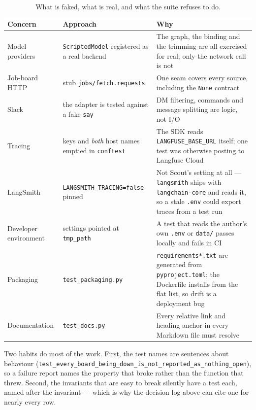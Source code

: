 \documentclass[11pt,a4paper]{article}
\newcommand{\tablefont}{\footnotesize}
\begin{document}
\begin{table}[!ht]
\centering\tablefont
\caption{What is faked, what is real, and what the suite refuses to do.}
\label{tab:testing}
\begin{tabularx}{\textwidth}{L{3.4cm} L{3.4cm} X}
\toprule
\textbf{Concern} & \textbf{Approach} & \textbf{Why} \\
\midrule
Model providers & \texttt{ScriptedModel} registered as a real backend & The graph, the
  binding and the trimming are all exercised for real; only the network call is not \\
Job-board HTTP & stub \texttt{jobs/fetch.requests} & One seam covers every source, including
  the \texttt{None} contract \\
Slack & the adapter is tested against a fake \texttt{say} & DM filtering, commands and
  message splitting are logic, not I/O \\
Tracing & keys and \emph{both} host names emptied in \texttt{conftest} & The SDK reads
  \texttt{LANGFUSE\_\allowbreak{}BASE\_\allowbreak{}URL} itself; one test was otherwise posting to Langfuse Cloud \\
LangSmith & \texttt{LANGSMITH\_\allowbreak{}TRACING=false} pinned & Not Scout's setting at all ---
  \texttt{langsmith} ships with \texttt{langchain-core} and reads it, so a stale
  \texttt{.env} could export traces from a test run \\
Developer environment & settings pointed at \texttt{tmp\_\allowbreak{}path} & A test that reads the
  author's own \texttt{.env} or \texttt{data/} passes locally and fails in CI \\
Packaging & \texttt{test\_\allowbreak{}packaging.py} & \texttt{requirements*.txt} are generated from
  \texttt{pyproject.toml}; the Dockerfile installs from the flat list, so drift is a
  deployment bug \\
Documentation & \texttt{test\_\allowbreak{}docs.py} & Every relative link and heading anchor in every
  Markdown file must resolve \\
\bottomrule
\end{tabularx}
\end{table}

Two habits do most of the work. First, the test names are sentences about behaviour
(\texttt{test\_\allowbreak{}every\_\allowbreak{}board\_\allowbreak{}being\_\allowbreak{}down\_\allowbreak{}is\_\allowbreak{}not\_\allowbreak{}reported\_\allowbreak{}as\_\allowbreak{}nothing\_\allowbreak{}open}), so a failure
report names the property that broke rather than the function that threw. Second, the
invariants that are easy to break silently have a test each, named after the invariant ---
which is why the decision log above can cite one for nearly every row.
\end{document}
